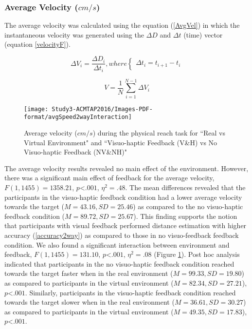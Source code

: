 \subsubsection{Average Velocity ($cm/s$)}
The average velocity was calculated using the equation (\ref{AvgVel}) in which the instantaneous velocity was generated using the $\Delta D$ and $\Delta t$ (time) vector (equation \ref{velocityF}).

\begin{equation} \label{velocityF}
\Delta V_i = \frac{\Delta D_i}{\Delta t_i}, where
\begin{cases}
\Delta t_i = t_{i+1}-t_{i}
\end{cases}
\end{equation}

\begin{equation} \label{AvgVel}
V = \frac{1}{N}\sum_{i=1}^{N-1}\Delta V_i 
\end{equation}

\begin{figure}
	\centering
	\texttt{[image: Study3-ACMTAP2016/Images-PDF-format/avgSpeed2wayInteraction]}
	\caption{\textsf{Average velocity ($cm/s$) during the physical reach task for ``Real vs Virtual Environment" and ``Visuo-haptic Feedback (V\&H) vs No Visuo-haptic Feedback (NV\&NH)"}}
	\label{fig:avgVel2way}
\end{figure}

The average velocity results revealed no main effect of the environment. However, there was a significant main effect of feedback for the average velocity, $F(1,1455)=1358.21$, $p$\textless$.001$, $\eta^{2}=.48$. The mean differences revealed that the participants in the visuo-haptic feedback condition had a lower average velocity towards the target ($M=43.16, SD=25.46$) as compared to the no visuo-haptic feedback condition ($M=89.72, SD=25.67$). This finding supports the notion that participants with visual feedback performed distance estimation with higher accuracy (\ref{accuracy2way}) as compared to those in no visuo-feedback feedback condition. We also found a significant interaction between environment and feedback, $F(1,1455)=131.10$, $p$\textless$.001$, $\eta^{2}=.08$ (Figure \ref{fig:avgVel2way}). Post hoc analysis indicated that participants in the no visuo-haptic feedback condition reached towards the target faster when in the real environment ($M=99.33, SD=19.80$) as compared to participants in the virtual environment ($M=82.34, SD=27.21$), $p$\textless$.001$. Similarly, participants in the visuo-haptic feedback condition reached towards the target slower when in the real environment ($M=36.61, SD=30.27$) as compared to participants in the virtual environment ($M=49.35, SD=17.83$), $p$\textless$.001$. 

